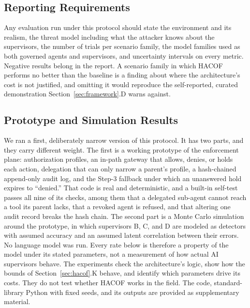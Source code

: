 \documentclass{ieeeaccess}
\newcommand{\hacof}{HACOF}
\begin{document}
\subsection{Reporting Requirements}

Any evaluation run under this protocol should state the environment and its realism, the threat model including what the attacker knows about the supervisors, the number of trials per scenario family, the model families used as both governed agents and supervisors, and uncertainty intervals on every metric. Negative results belong in the report. A scenario family in which \hacof{} performs no better than the baseline is a finding about where the architecture's cost is not justified, and omitting it would reproduce the self-reported, curated demonstration Section~\ref{sec:framework}.D warns against.

\subsection{Prototype and Simulation Results}
\label{sec:eval-results}

We ran a first, deliberately narrow version of this protocol. It has two parts, and they carry different weight. The first is a working prototype of the enforcement plane: authorization profiles, an in-path gateway that allows, denies, or holds each action, delegation that can only narrow a parent's profile, a hash-chained append-only audit log, and the Step-3 fallback under which an unanswered hold expires to ``denied.'' That code is real and deterministic, and a built-in self-test passes all nine of its checks, among them that a delegated sub-agent cannot reach a tool its parent lacks, that a revoked agent is refused, and that altering one audit record breaks the hash chain. The second part is a Monte Carlo simulation around the prototype, in which supervisors B, C, and D are modeled as detectors with assumed accuracy and an assumed latent correlation between their errors. No language model was run. Every rate below is therefore a property of the model under its stated parameters, not a measurement of how actual AI supervisors behave. The experiments check the architecture's logic, show how the bounds of Section~\ref{sec:hacof}.K behave, and identify which parameters drive its costs. They do not test whether \hacof{} works in the field. The code, standard-library Python with fixed seeds, and its outputs are provided as supplementary material.
\end{document}
